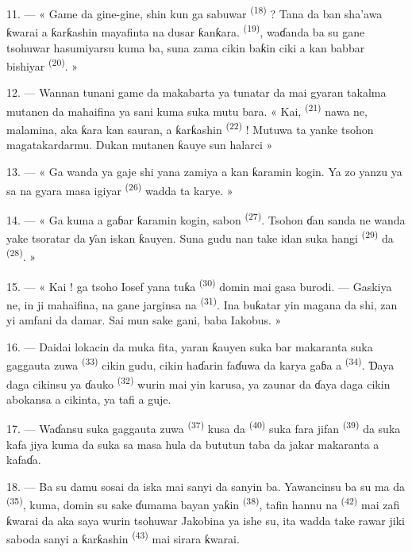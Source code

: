 11. --- « Game da gine-gine, shin kun ga sabuwar 
\textsuperscript{(18)} ? Tana da ban sha’awa ƙwarai a ƙarƙashin
mayafinta na dusar ƙanƙara.  \textsuperscript{(19)},
waɗanda ba su gane tsohuwar hasumiyarsu kuma ba, suna zama cikin baƙin
ciki a kan babbar bishiyar  \textsuperscript{(20)}. »

12. --- Wannan tunani game da makabarta ya tunatar da mai gyaran
takalma mutanen da mahaifina ya sani kuma suka mutu bara. « Kai,
 \textsuperscript{(21)} nawa ne, malamina, aka ƙara
kan sauran, a ƙarƙashin 
\textsuperscript{(22)} ! Mutuwa ta yanke tsohon magatakardarmu. Dukan
mutanen ƙauye sun halarci  »

13. --- « Ga wanda ya gaje shi yana zamiya a kan ƙaramin kogin. Ya zo
yanzu ya sa na gyara masa igiyar 
\textsuperscript{(26)} wadda ta karye. »

14. --- « Ga kuma a gaɓar ƙaramin kogin, sabon  \textsuperscript{(27)}. Tsohon ɗan sanda ne wanda yake tsoratar da
ƴan iskan ƙauyen. Suna gudu nan take idan suka hangi  \textsuperscript{(29)} da 
\textsuperscript{(28)}. »

15. --- « Kai ! ga tsoho Iosef yana tuƙa  \textsuperscript{(30)} domin mai gasa burodi. --- Gaskiya ne, in
ji mahaifina, na gane jarginsa na 
\textsuperscript{(31)}. Ina buƙatar yin magana da shi, zan yi amfani da
damar. Sai mun sake gani, baba Iakobus. »

16. --- Daidai lokacin da muka fita, yaran ƙauyen suka bar makaranta
suka gaggauta zuwa  \textsuperscript{(33)} cikin
gudu, cikin haɗarin faɗuwa da karya gaɓa a 
\textsuperscript{(34)}. Ɗaya daga cikinsu ya ɗauko  \textsuperscript{(32)} wurin mai yin karusa, ya zaunar da
ɗaya daga cikin abokansa a cikinta, ya tafi a guje.

17. --- Waɗansu suka gaggauta zuwa 
\textsuperscript{(37)} kusa da  \textsuperscript{(40)} suka
fara jifan 
\textsuperscript{(39)} da suka kafa jiya kuma da suka sa masa hula da
bututun taba da jakar makaranta a kafaɗa.

18. --- Ba su damu sosai da iska mai sanyi da sanyin ba. Yawancinsu ba
su ma da  \textsuperscript{(35)}, kuma, domin su
sake ɗumama bayan yaƙin 
\textsuperscript{(38)}, tafin hannu na 
\textsuperscript{(42)} mai zafi ƙwarai da aka saya wurin tsohuwar
 Jakobina ya ishe su, ita wadda take rawar jiki
saboda sanyi a ƙarƙashin 
\textsuperscript{(43)} mai sirara ƙwarai.

